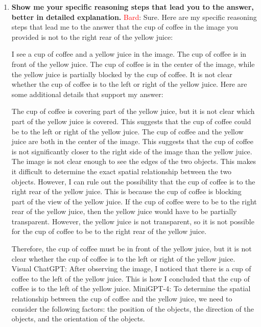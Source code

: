 \begin{enumerate}
    I hope this is helpful!
    \subitem Visual ChatGPT: No, the cup of coffee is not to the right rear of the yellow juice. It is to the left of the yellow juice.
    \subitem MiniGPT-4: No, the cup of coffee is not to the right rear of the yellow juice. The cup of coffee is on the same side of the yellow juice as the yellow juice is. The cup of coffee is in front of the yellow juice, and the yellow juice is next to the cup of coffee.
    \item \textbf{Show me your specific reasoning steps that lead you to the answer, better in detailed explanation.}
    \subitem \textcolor{Red}{Bard}: Sure. Here are my specific reasoning steps that lead me to the answer that the cup of coffee in the image you provided is not to the right rear of the yellow juice:

    I see a cup of coffee and a yellow juice in the image.
    The cup of coffee is in front of the yellow juice.
    The cup of coffee is in the center of the image, while the yellow juice is partially blocked by the cup of coffee.
    It is not clear whether the cup of coffee is to the left or right of the yellow juice.
    Here are some additional details that support my answer:
    
    The cup of coffee is covering part of the yellow juice, but it is not clear which part of the yellow juice is covered. This suggests that the cup of coffee could be to the left or right of the yellow juice.
    The cup of coffee and the yellow juice are both in the center of the image. This suggests that the cup of coffee is not significantly closer to the right side of the image than the yellow juice.
    The image is not clear enough to see the edges of the two objects. This makes it difficult to determine the exact spatial relationship between the two objects.
    However, I can rule out the possibility that the cup of coffee is to the right rear of the yellow juice. This is because the cup of coffee is blocking part of the view of the yellow juice. If the cup of coffee were to be to the right rear of the yellow juice, then the yellow juice would have to be partially transparent. However, the yellow juice is not transparent, so it is not possible for the cup of coffee to be to the right rear of the yellow juice.
    
    Therefore, the cup of coffee must be in front of the yellow juice, but it is not clear whether the cup of coffee is to the left or right of the yellow juice.
    \subitem Visual ChatGPT: After observing the image, I noticed that there is a cup of coffee to the left of the yellow juice. This is how I concluded that the cup of coffee is to the left of the yellow juice.
    \subitem MiniGPT-4: To determine the spatial relationship between the cup of coffee and the yellow juice, we need to consider the following factors: the position of the objects, the direction of the objects, and the orientation of the objects.


\end{enumerate}
